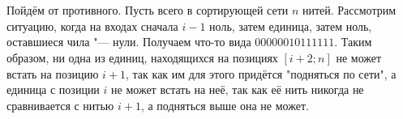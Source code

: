 \section{}
	Пойдём от противного. Пусть всего в сортирующей сети $n$ нитей. Рассмотрим ситуацию, когда на входах сначала $i - 1$ ноль, затем единица, затем ноль, оставшиеся чила "--- нули. Получаем что-то вида $00000010111111$. Таким образом, ни одна из единиц, находящихся на позициях $[i +2; n]$ не может встать на позицию $i + 1$, так как им для этого придётся "подняться по сети", а единица с позиции $i$ не может встать на неё, так как её нить никогда не сравнивается с нитью $i+1$, а подняться выше она не может.